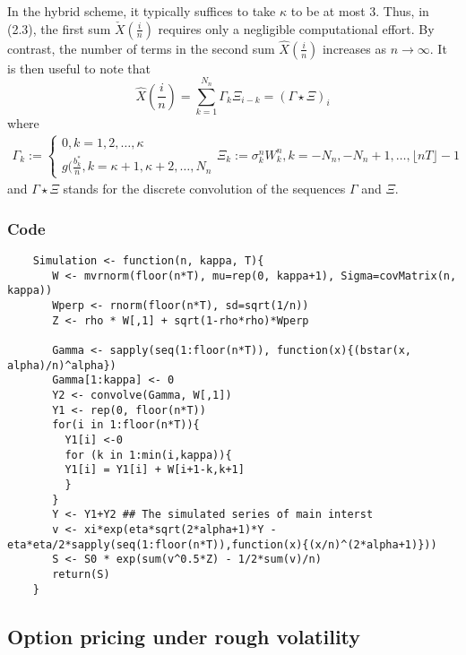 \documentclass[12pt]{article}
\numberwithin{equation}{section}
\begin{document}
      In the hybrid scheme, it typically suffices to take $\kappa$ to be at most 3. Thus, in (2.3), the first sum $\check{X}(\frac{i}{n})$ requires only a negligible computational effort. By contrast, the number of terms in the second sum $\hat{X}(\frac{i}{n})$ increases as $n\rightarrow\infty$. It is then useful to note that
      \begin{equation}
        \hat{X}(\frac{i}{n}) = \sum_{k=1}^{N_n} \Gamma_k \Xi_{i-k} = (\Gamma\star\Xi)_i
      \end{equation}
      where
      \begin{equation}
        \begin{split}
          \Gamma_k := \begin{cases}
            0, k=1,2,\dots,\kappa \\
            g(\frac{b_k^*}{n}, k = \kappa+1,\kappa+2,\dots,N_n
          \end{cases}
          \Xi_k := \sigma_k^nW_k^n, k = -N_n, -N_n+1, \dots, \lfloor nT \rfloor - 1
        \end{split}
      \end{equation}
      and $\Gamma\star\Xi$ stands for the discrete convolution of the sequences $\Gamma$ and $\Xi$.
      
      \subsubsection{Code}
        \begin{lstlisting}
    Simulation <- function(n, kappa, T){
       W <- mvrnorm(floor(n*T), mu=rep(0, kappa+1), Sigma=covMatrix(n, kappa))
       Wperp <- rnorm(floor(n*T), sd=sqrt(1/n))
       Z <- rho * W[,1] + sqrt(1-rho*rho)*Wperp
       
       Gamma <- sapply(seq(1:floor(n*T)), function(x){(bstar(x, alpha)/n)^alpha}) 
       Gamma[1:kappa] <- 0
       Y2 <- convolve(Gamma, W[,1])
       Y1 <- rep(0, floor(n*T))
       for(i in 1:floor(n*T)){
         Y1[i] <-0
         for (k in 1:min(i,kappa)){
         Y1[i] = Y1[i] + W[i+1-k,k+1]
         }
       }
       Y <- Y1+Y2 ## The simulated series of main interst
       v <- xi*exp(eta*sqrt(2*alpha+1)*Y - eta*eta/2*sapply(seq(1:floor(n*T)),function(x){(x/n)^(2*alpha+1)}))
       S <- S0 * exp(sum(v^0.5*Z) - 1/2*sum(v)/n)
       return(S)
    }
        \end{lstlisting}
        
    \subsection{Option pricing under rough volatility}
        
\end{document}
